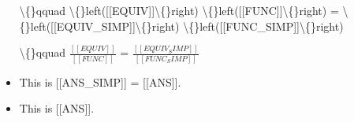 \documentclass{article}
\begin{document}
\begin{itemize}
                        \textbackslash\{\}qquad
                            \textbackslash\{\}left([[EQUIV]]\textbackslash\{\}right)
                            \textbackslash\{\}left([[FUNC]]\textbackslash\{\}right) 
                            =
                            \textbackslash\{\}left([[EQUIV\_SIMP]]\textbackslash\{\}right)
                            \textbackslash\{\}left([[FUNC\_SIMP]]\textbackslash\{\}right) 
                        
                    
                    
                        \textbackslash\{\}qquad
                            $\frac{[[EQUIV]]}{[[FUNC]]}$
                            =
                            $\frac{[[EQUIV_SIMP]]}{[[FUNC_SIMP]]}$
  \item This is [[ANS\_SIMP]] = [[ANS]].
  \item This is [[ANS]].
\end{itemize}
\end{document}
